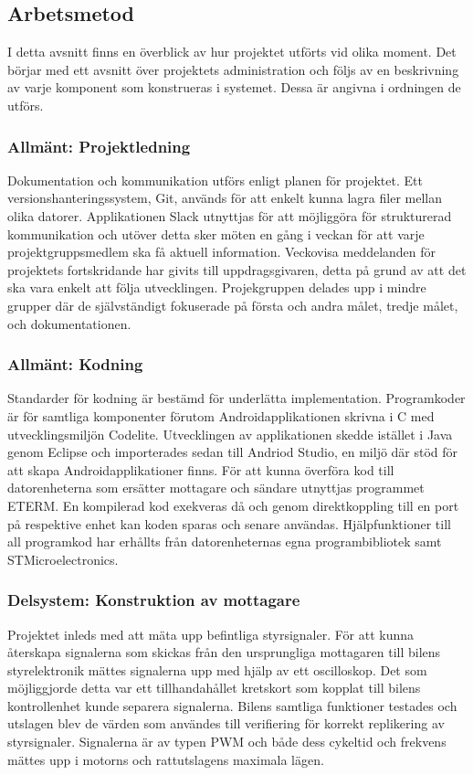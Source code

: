 \documentclass[a4paper]{article}
\begin{document}
\subsection{Arbetsmetod}
I detta avsnitt finns en överblick av hur projektet utförts vid olika moment. Det börjar med ett avsnitt över projektets administration och följs av en beskrivning av varje komponent som konstrueras i systemet. Dessa är angivna i ordningen de utförs.

\subsubsection{Allmänt: Projektledning}
Dokumentation och kommunikation utförs enligt planen för projektet. Ett versionshanteringssystem, Git, används för att enkelt kunna lagra filer mellan olika datorer. Applikationen Slack utnyttjas för att möjliggöra för strukturerad kommunikation och utöver detta sker möten en gång i veckan för att varje projektgruppsmedlem ska få aktuell information. Veckovisa meddelanden för projektets fortskridande har givits till uppdragsgivaren, detta på grund av att det ska vara enkelt att följa utvecklingen. Projekgruppen delades upp i mindre grupper där de självständigt fokuserade på första och andra målet, tredje målet, och dokumentationen.

\subsubsection{Allmänt: Kodning}
Standarder för kodning är bestämd för underlätta implementation. Programkoder är för samtliga komponenter förutom Androidapplikationen skrivna i C med utvecklingsmiljön Codelite. Utvecklingen av applikationen skedde istället i Java genom Eclipse och importerades sedan till Andriod Studio, en miljö där stöd för att skapa Androidapplikationer finns. För att kunna överföra kod till datorenheterna som ersätter mottagare och sändare utnyttjas programmet ETERM. En kompilerad kod exekveras då och genom direktkoppling till en port på respektive enhet kan koden sparas och senare användas. Hjälpfunktioner till all programkod har erhållts från datorenheternas egna programbibliotek samt STMicroelectronics. 


\subsubsection{Delsystem: Konstruktion av mottagare}
Projektet inleds med att mäta upp befintliga styrsignaler. För att kunna återskapa signalerna som skickas från den ursprungliga mottagaren till bilens styrelektronik mättes signalerna upp med hjälp av ett oscilloskop. Det som möjliggjorde detta var ett tillhandahållet kretskort som kopplat till bilens kontrollenhet kunde separera signalerna. Bilens samtliga funktioner testades och utslagen blev de värden som användes till verifiering för korrekt replikering av styrsignaler. Signalerna är av typen PWM och både dess cykeltid och frekvens mättes upp i motorns och rattutslagens maximala lägen. 
\end{document}
